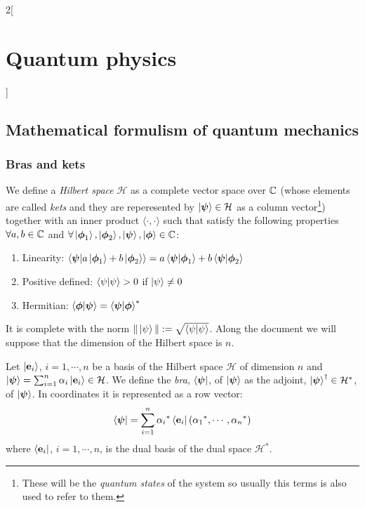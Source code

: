\documentclass[../../../main.tex]{subfiles}
\begin{document}
\renewcommand{\col}{\phy}
\begin{multicols}{2}[\section{Quantum physics}]
  \subsection{Mathematical formulism of quantum mechanics}
  \subsubsection{Bras and kets}
  \begin{definition}[Ket]
    We define a \emph{Hilbert space} $\mathcal{H}$ as a complete vector space over $\mathbb{C}$ (whose elements are called \emph{kets} and they are reperesented by $\ket{\boldsymbol{\mathrm{\psi}}}\in\mathcal{H}$ as a column vector\footnote{These will be the \emph{quantum states} of the system so usually this terms is also used to refer to them.}) together with an inner product $\langle\cdot,\cdot\rangle$ such that satisfy the following properties $\forall a,b\in\mathbb{C}$ and $\forall \ket{\boldsymbol{\mathrm{\phi}}_1},\ket{\boldsymbol{\mathrm{\phi}}_2},\ket{\boldsymbol{\mathrm{\psi}}},\ket{\boldsymbol{\mathrm{\phi}}}\in \mathbb{C}$:
    \begin{enumerate}
      \item Linearity: $\braket{\boldsymbol{\mathrm{\psi}}}{a\ket{\boldsymbol{\mathrm{\phi}}_1}+b\ket{\boldsymbol{\mathrm{\phi}}_2}}=a\braket{\boldsymbol{\mathrm{\psi}}}{\boldsymbol{\mathrm{\phi}}_1}+b\braket{\boldsymbol{\mathrm{\psi}}}{\boldsymbol{\mathrm{\phi}}_2}$
      \item Positive defined: $\braket{\psi}{\psi}>0$ if $\ket{\psi}\ne 0$
      \item Hermitian: $\braket{\boldsymbol{\mathrm{\phi}}}{\boldsymbol{\mathrm{\psi}}}={\braket{\boldsymbol{\mathrm{\psi}}}{\boldsymbol{\mathrm{\phi}}}}^*$
    \end{enumerate}
    It is complete with the norm $\|\ket{\psi}\|:=\sqrt{\braket{\psi}{\psi}}$. Along the document we will suppose that the dimension of the Hilbert space is $n$.
  \end{definition}
  \begin{definition}[Bra]
    Let $\ket{\boldsymbol{\mathrm{e}}_i}$, $i=1,\cdots,n$ be a basis of the Hilbert space $\mathcal{H}$ of dimension $n$ and $\ket{\boldsymbol{\mathrm{\psi}}}=\sum_{i=1}^n\alpha_i\ket{\boldsymbol{\mathrm{e}}_i}\in\mathcal{H}$. We define the \emph{bra}, $\bra{\boldsymbol{\mathrm{\psi}}}$, of $\ket{\boldsymbol{\mathrm{\psi}}}$ as the adjoint, ${\ket{\boldsymbol{\mathrm{\psi}}}}^\dag\in\mathcal{H}^*$, of $\ket{\boldsymbol{\mathrm{\psi}}}$. In coordinates it is represented as a row vector:
    $$\bra{\boldsymbol{\mathrm{\psi}}}=\sum_{i=1}^n{\alpha_i}^*\bra{\boldsymbol{\mathrm{e}}_i}({\alpha_1}^*,\cdots,{\alpha_n}^*)$$ where $\bra{\boldsymbol{\mathrm{e}}_i}$, $i=1,\cdots,n$, is the dual basis of the dual space $\mathcal{H}^*$.
  \end{definition}

\end{multicols}
\end{document}
